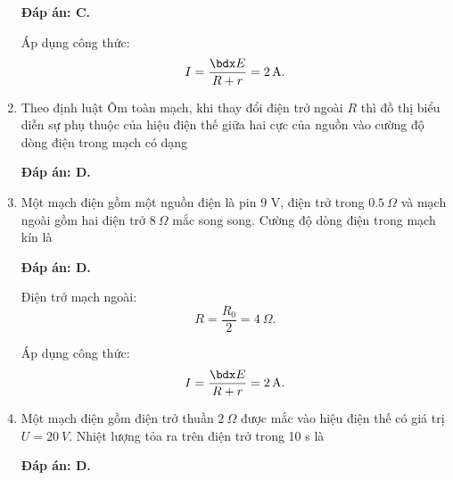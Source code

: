 \begin{enumerate}[label=\bfseries Câu \arabic*:]
{	}
	\loigiai
	{	\textbf{Đáp án: C.}
		
		Áp dụng công thức:
		$$I=\dfrac{\calE}{R+r} = \SI{2}{A}.$$
	}
	\item {}
	
	\cauhoi
	{Theo định luật Ôm toàn mạch, khi thay đổi điện trở ngoài $R$ thì đồ thị biểu diễn sự phụ thuộc của hiệu điện thế giữa hai cực của nguồn vào cường độ dòng điện trong mạch có dạng
		
	}
	\loigiai
	{	\textbf{Đáp án: D.}
		
	}
	\item {}
	
	\cauhoi
	{Một mạch điện gồm một nguồn điện là pin 9 V, điện trở trong $\SI{0.5}{\Omega}$ và mạch ngoài gồm hai điện trở $\SI{8}{\Omega}$ mắc song song. Cường độ dòng điện trong mạch kín là
		
	}
	\loigiai
	{	\textbf{Đáp án: D.}
		
		Điện trở mạch ngoài:
		$$R=\dfrac{R_0}{2} = \SI{4}{\Omega}.$$
		
		Áp dụng công thức:
		$$I=\dfrac{\calE}{R+r} = \SI{2}{A}.$$
	}
	\item {}
	
	\cauhoi
	{Một mạch điện gồm điện trở thuần $\SI{2}{\Omega}$ được mắc vào hiệu điện thế có giá trị $U=\SI{20}{V}$. Nhiệt lượng tỏa ra trên điện trở trong 10 s là
		
	}
	\loigiai
	{	\textbf{Đáp án: D.}
		
}
\end{enumerate}
